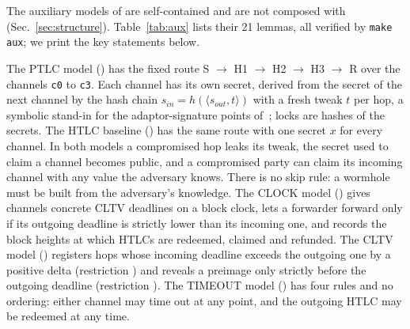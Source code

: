 The auxiliary models of  are self-contained and are not composed with
 (Sec.~\ref{sec:structure}). Table~\ref{tab:aux} lists their 21 lemmas,
all verified by \texttt{make aux}; we print the key statements below.

The PTLC model () has the fixed route S $\rightarrow$ H1 $\rightarrow$ H2
$\rightarrow$ H3 $\rightarrow$ R over the channels \texttt{c0} to \texttt{c3}. Each channel has
its own secret, derived from the secret of the next channel by the hash chain
$s_{\mathit{in}} = h(\langle s_{\mathit{out}}, t\rangle)$ with a fresh tweak $t$ per hop, a
symbolic stand-in for the adaptor-signature points of~\cite{malavolta2019}; locks are hashes of
the secrets. The HTLC baseline () has the same route with one secret $x$ for every
channel. In both models a compromised hop leaks its tweak, the secret used to claim a channel
becomes public, and a compromised party can claim its incoming channel with any value the
adversary knows. There is no skip rule: a wormhole must be built from the adversary's knowledge.
The CLOCK model () gives channels concrete CLTV deadlines on a block clock, lets a
forwarder forward only if its outgoing deadline is strictly lower than its incoming one, and
records the block heights at which HTLCs are redeemed, claimed and refunded. The CLTV model
() registers hops whose incoming deadline exceeds the outgoing one by a positive
delta (restriction ) and reveals a preimage only strictly before the
outgoing deadline (restriction ). The TIMEOUT model () has four rules and no ordering:
either channel may time out at any point, and the outgoing HTLC may be redeemed at any time.

